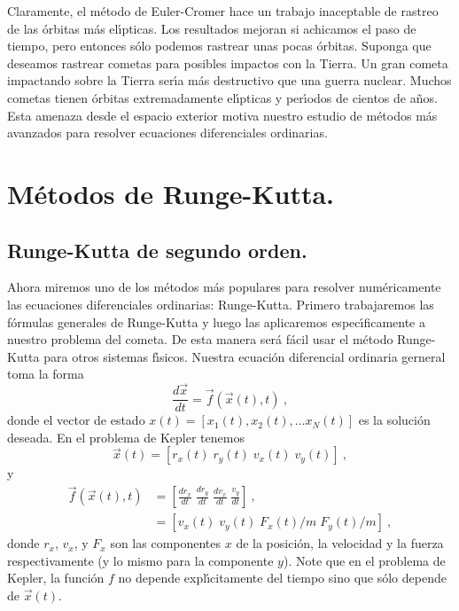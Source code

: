 Claramente, el m{\'e}todo de Euler-Cromer hace un trabajo inaceptable de
rastreo de las {\'o}rbitas m{\'a}s el{\'\i}pticas. Los resultados mejoran si
achicamos el paso de tiempo, pero entonces s{\'o}lo podemos rastrear unas
pocas {\'o}rbitas. Suponga que deseamos rastrear cometas para posibles
impactos con la Tierra. Un gran cometa impactando sobre la Tierra
ser{\'\i}a m{\'a}s destructivo que una guerra nuclear. Muchos cometas tienen
{\'o}rbitas extremadamente el{\'\i}pticas y per{\'\i}odos de cientos de a{\~n}os. Esta
amenaza desde el espacio exterior motiva nuestro estudio de m{\'e}todos
m{\'a}s avanzados para resolver ecuaciones diferenciales ordinarias.



\section{M{\'e}todos de Runge-Kutta.}

\subsection{Runge-Kutta de segundo orden.}

Ahora miremos uno de los m{\'e}todos m{\'a}s populares para resolver
num{\'e}ricamente las ecuaciones diferenciales ordinarias: Runge-Kutta.
Primero trabajaremos las f{\'o}rmulas generales de Runge-Kutta y luego las
aplicaremos espec{\'\i}ficamente a nuestro problema del cometa. De esta
manera ser{\'a} f{\'a}cil usar el m{\'e}todo Runge-Kutta para otros sistemas
f{\'\i}sicos.  Nuestra ecuaci{\'o}n diferencial ordinaria gerneral toma la forma
\begin{equation}
\label{c11-e3.15}
\frac{d\vec x}{dt}=\vec f(\vec x(t),t)\ ,
\end{equation}
donde el vector de estado $x(t)= [x_1(t),x_2(t),\ldots x_N(t)]$ es la
soluci{\'o}n deseada. En el problema de Kepler tenemos
\begin{equation}
\label{c11-e3.16}
\vec x(t)=[r_x(t)\; r_y(t) \; v_x(t)\; v_y(t)]\ ,
\end{equation}
y
\begin{equation}
\label{c11-e3.17}
\begin{split}
\vec f(\vec x(t),t)&= \left [ \frac{dr_x}{dt}\; \frac{dr_y}{dt}\; 
\frac{dv_x}{dt} \; \frac{v_y}{dt}\right ]\ ,\\
&=[  v_x(t)\; v_y(t)\; F_x(t)/m\; F_y(t)/m ]\ ,
\end{split}
\end{equation}
donde $r_x$, $v_x$, y $F_x$ son las componentes $x$ de la posici{\'o}n, la
velocidad y la fuerza respectivamente (y lo mismo para la componente
$y$). Note que en el problema de Kepler, la funci{\'o}n $f$ no depende
expl{\'\i}citamente del tiempo sino que s{\'o}lo depende de $\vec x(t)$.

